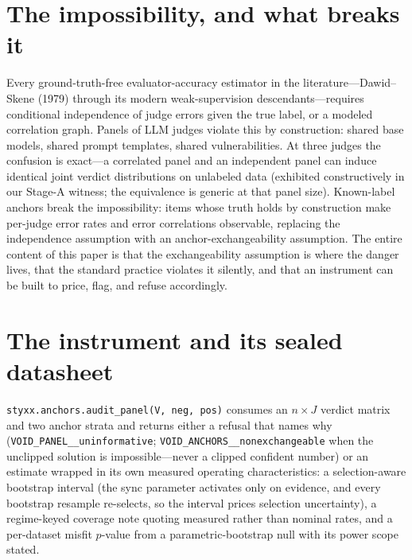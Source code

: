 \documentclass[11pt]{article}
\begin{document}
\section{The impossibility, and what breaks it}

Every ground-truth-free evaluator-accuracy estimator in the literature---Dawid--Skene (1979) through
its modern weak-supervision descendants---requires conditional independence of judge errors given the
true label, or a modeled correlation graph. Panels of LLM judges violate this by construction: shared
base models, shared prompt templates, shared vulnerabilities. At three judges the confusion is
exact---a correlated panel and an independent panel can induce identical joint verdict distributions
on unlabeled data (exhibited constructively in our Stage-A witness; the equivalence is generic at
that panel size). Known-label anchors break the impossibility: items whose truth holds by
construction make per-judge error rates and error correlations observable, replacing the independence
assumption with an anchor-exchangeability assumption. The entire content of this paper is that the
exchangeability assumption is where the danger lives, that the standard practice violates it
silently, and that an instrument can be built to price, flag, and refuse accordingly.

\section{The instrument and its sealed datasheet}

\texttt{styxx.anchors.audit\_panel(V, neg, pos)} consumes an $n\times J$ verdict matrix and two anchor
strata and returns either a refusal that names why (\texttt{VOID\_PANEL\_\_\allowbreak uninformative};
\texttt{VOID\_ANCHORS\_\_\allowbreak nonexchangeable} when the unclipped solution is impossible---never a clipped
confident number) or an estimate wrapped in its own measured operating characteristics: a
selection-aware bootstrap interval (the sync parameter activates only on evidence, and every bootstrap
resample re-selects, so the interval prices selection uncertainty), a regime-keyed coverage note
quoting measured rather than nominal rates, and a per-dataset misfit $p$-value from a
parametric-bootstrap null with its power scope stated.
\end{document}
